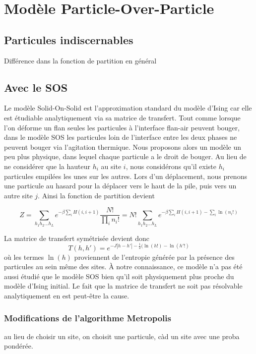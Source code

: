 \chapter{Modèle Particle-Over-Particle }
    \label{chap-pop}


	\section{Particules indiscernables}
	Différence dans la fonction de partition en général


	\section{Avec le SOS}
	Le modèle Solid-On-Solid est l'approximation standard du modèle d'Ising car elle est étudiable analytiquement via sa matrice de transfert. 	Tout comme lorsque l'on déforme un flan seules les particules à l'interface flan-air peuvent bouger, dans le modèle SOS les particules loin de l'interface entre les deux phases ne peuvent bouger via l'agitation thermique. 
	Nous proposons alors un modèle un peu plus physique, dans lequel chaque particule a le droit de bouger. Au lieu de ne considérer que la hauteur $h_i$ au site $i$, nous considérons qu'il existe $h_i$ particules empilées les unes sur les autres. Lors d'un déplacement, nous prenons une particule au hasard pour la déplacer vers le haut de la pile, puis vers un autre site $j$. 
	Ainsi la fonction de partition devient
	
\begin{equation}
	Z = \sum_{h_1 h_2 ... h_L} e^{- \beta \sum_{i} H(i,i+1)} \frac{N!}{\prod_i n_i!} = N! \sum_{h_1 h_2 ... h_L} e^{- \beta \sum_{i} H(i,i+1) -\sum_i \ln(n_i!)}
\end{equation}

La matrice de transfert symétrisée devient donc
\begin{equation}
	T(h,h') = e^{-J |h-h'| - \frac{1}{2}(\ln(h!)-\ln(h'!)}
\end{equation}
où les termes $\ln(h)$ proviennent de l'entropie générée par la présence des particules au sein même des sites. À notre connaissance, ce modèle n'a pas été aussi étudié que le modèle SOS bien qu'il soit physiquement plus proche du modèle d'Ising initial. Le fait que la matrice de transfert ne soit pas résolvable analytiquement en est peut-être la cause. 
		\subsection{Modifications de l'algorithme Metropolis}
		au lieu de choisir un site, on choisit une particule, càd un site avec une proba pondérée.



